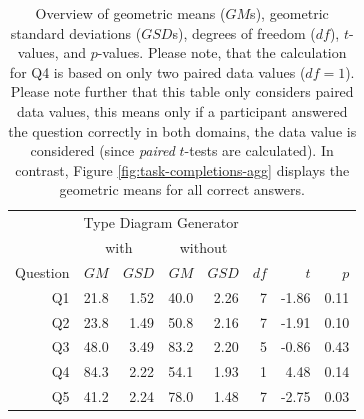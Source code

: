 \documentclass[runningheads]{llncs}
\begin{document}
\begin{itemize}
  \begin{table}[]
    \centering
    \begin{tabular}{rrrrrrrr}
    \toprule
         & \multicolumn{4}{c}{Type Diagram Generator} & & &                                                                   \\
         & \multicolumn{2}{c}{with}                   & \multicolumn{2}{c}{without} &      &       &                     \\
\cmidrule(r){2-3}\cmidrule(r){4-5}
Question & $GM$                                       & $GSD$                       & $GM$ & $GSD$ & $df$ & $t$   & $p$  \\
\midrule
      Q1 & 21.8                                       & 1.52                        & 40.0 & 2.26  & 7    & -1.86 & 0.11 \\
      Q2 & 23.8                                       & 1.49                        & 50.8 & 2.16  & 7    & -1.91 & 0.10 \\
      Q3 & 48.0                                       & 3.49                        & 83.2 & 2.20  & 5    & -0.86 & 0.43 \\
      Q4 & 84.3                                       & 2.22                        & 54.1 & 1.93  & 1    & 4.48  & 0.14 \\
      Q5 & 41.2                                       & 2.24                        & 78.0 & 1.48  & 7    & -2.75 & 0.03 \\
\bottomrule
    \end{tabular}

    \caption{Overview of geometric means ($GM$s), geometric standard deviations ($GSD$s), degrees of freedom ($df$), $t$-values, and $p$-values. Please note, that the calculation for Q4 is based on only two paired data values ($df = 1$). Please note further that this table only considers paired data values, this means only if a participant answered the question correctly in both domains, the data value is considered (since \emph{paired} $t$-tests are calculated). In contrast, Figure \ref{fig:task-completions-agg} displays the geometric means for all correct answers.}

    \label{tab:p-values}
  \end{table}


\end{itemize}
\end{document}
